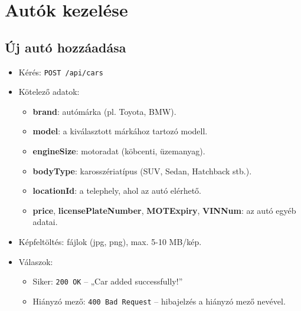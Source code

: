 \documentclass{report}[11pt]
\begin{document}
\section{Autók kezelése}

\subsection{Új autó hozzáadása}
\begin{itemize}
    \item Kérés: \texttt{POST /api/cars}
    \item Kötelező adatok:
    \begin{itemize}
        \item \textbf{brand}: autómárka (pl. Toyota, BMW).
        \item \textbf{model}: a kiválasztott márkához tartozó modell.
        \item \textbf{engineSize}: motoradat (köbcenti, üzemanyag).
        \item \textbf{bodyType}: karosszériatípus (SUV, Sedan, Hatchback stb.).
        \item \textbf{locationId}: a telephely, ahol az autó elérhető.
        \item \textbf{price}, \textbf{licensePlateNumber}, \textbf{MOTExpiry}, \textbf{VINNum}: az autó egyéb adatai.
    \end{itemize}
    \item Képfeltöltés: fájlok (jpg, png), max. 5-10 MB/kép.
    \item Válaszok:
    \begin{itemize}
        \item Siker: \texttt{200 OK} – „Car added successfully!”
        \item Hiányzó mező: \texttt{400 Bad Request} – hibajelzés a hiányzó mező nevével.
    \end{itemize}
\end{itemize}
\end{document}
